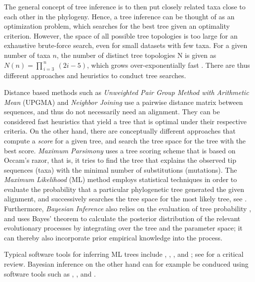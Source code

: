 The general concept of tree inference is to then put closely related taxa close to each other in the phylogeny.
Hence, a tree inference can be thought of as an optimization problem,
which searches for the best tree given an optimality criterion.
However, the space of all possible tree topologies is too large for an exhaustive brute-force search,
even for small datasets with few taxa.
For a given number of taxa $n$, the number of distinct tree topologies N is given as
$N(n) = \prod_{\,i=3}^{\,n} ~(2i - 5)$,
which grows over-exponentially fast \cite{Felsenstein2004}.
There are thus different approaches and heuristics to conduct tree searches.

Distance based methods such as \emph{Unweighted Pair Group Method with Arithmetic Mean} (UPGMA) \cite{Sokal1958}
and \emph{Neighbor Joining} \cite{Saitou1987}
use a pairwise distance matrix between sequences, and thus do not necessarily need an alignment.
They can be considered fast heuristics that yield a tree that is optimal under their respective criteria.
On the other hand, there are conceptually different approaches that compute a \emph{score} for a given tree,
and search the tree space for the tree with the best score.
\emph{Maximum Parsimony} \cite{Sankoff1975} uses a tree scoring scheme that is based on Occam's razor,
that is, it tries to find the tree that explains the observed tip sequences (taxa)
with the minimal number of substitutions (mutations).
The \emph{Maximum Likelihood} (ML) method \cite{Felsenstein1981} employs statistical techniques
in order to evaluate the probability that a particular phylogenetic tree generated the given alignment,
and successively searches the tree space for the most likely tree, see .
Furthermore, \emph{Bayesian Inference} also relies on the evaluation of tree probability \cite{Yang2006},
and uses Bayes' theorem to calculate the posterior distribution of the relevant evolutionary processes
by integrating over the tree and the parameter space;
it can thereby also incorporate prior empirical knowledge into the process.

Typical software tools for inferring ML trees include  \cite{Nguyen2015a},
 \cite{Price2010},  \cite{Zwickl2006}, and  \cite{Stamatakis2014,Kozlov2018a};
see  for a critical review.
Bayesian inference on the other hand can for example be conduced using software tools such as
 \cite{Suchard2018},  \cite{Ronquist2003}, and  \cite{Aberer2014}.

